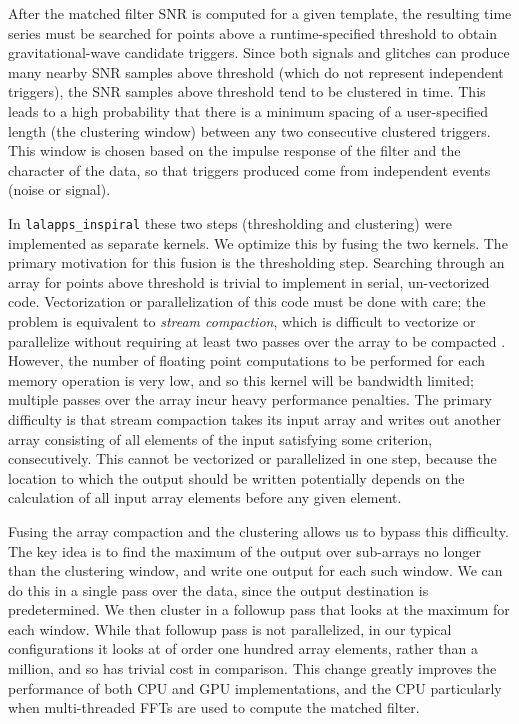 After the matched filter SNR is computed for a given template, 
the resulting time
series must be searched for points above a runtime-specified threshold to
obtain gravitational-wave candidate triggers.  Since both signals and glitches can produce
many nearby SNR samples above threshold (which do not represent independent
triggers), the SNR samples above threshold tend to be clustered in time. This leads to a high probability
that there is a minimum spacing of a user-specified length (the
clustering window) between any two consecutive clustered triggers. This window
is chosen based on the impulse response of the filter and the character of the
data, so that triggers produced come from independent events (noise or signal).

In \texttt{lalapps\_inspiral} these two steps (thresholding and clustering) were
implemented as separate kernels. We optimize this by fusing the two kernels. The
primary motivation for this fusion is the thresholding step.  Searching through
an array for points above threshold is trivial to implement in serial,
un-vectorized code.  Vectorization or
parallelization of this code must be done with care; the problem is 
equivalent to \emph{stream compaction}, which is difficult to vectorize or
parallelize without requiring at least two passes over the array to be compacted
\cite{Billeter:2009:ESC:1572769.1572795}. However, the number of floating point
computations to be performed for each memory operation is very low, and so this
kernel will be bandwidth limited; multiple passes over the array incur heavy
performance penalties. The primary difficulty is that stream compaction takes
its input array and writes out another array consisting of all elements of the
input satisfying some criterion, consecutively.  This cannot be vectorized or
parallelized in one step, because the location to which the output should be
written potentially depends on the calculation of all input array elements
before any given element.

Fusing the array compaction and the clustering allows us to bypass this
difficulty. The key idea is to find the maximum of the output over sub-arrays no
longer than the clustering window, and write one output for each such window.
We can do this in a single pass over the data, since the output destination is
predetermined.  We then cluster in a followup pass that looks at the maximum
for each window.  While that followup pass is not parallelized, in our typical
configurations it looks at of order one hundred array elements, rather than a
million, and so has trivial cost in comparison. This change greatly
improves the performance of both CPU and GPU implementations, and the CPU
particularly when multi-threaded FFTs are used to compute the matched filter. 

